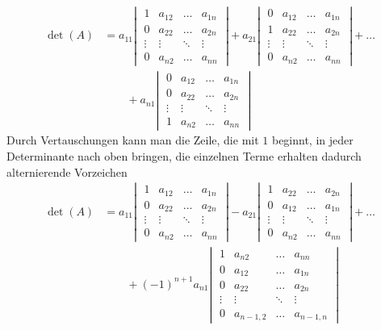 \begin{align*}
\det(A)
&=
a_{11}
\left|\;
\begin{matrix}
1&a_{12}&\dots&a_{1n}\\
0&a_{22}&\dots&a_{2n}\\
\vdots&\vdots&\ddots&\vdots\\
0&a_{n2}&\dots&a_{nn}
\end{matrix}
\;\right|
+a_{21}
\left|\;
\begin{matrix}
0&a_{12}&\dots&a_{1n}\\
1&a_{22}&\dots&a_{2n}\\
\vdots&\vdots&\ddots&\vdots\\
0&a_{n2}&\dots&a_{nn}
\end{matrix}
\;\right|
+\dots
\\
&\qquad
+a_{n1}
\left|\;
\begin{matrix}
0&a_{12}&\dots&a_{1n}\\
0&a_{22}&\dots&a_{2n}\\
\vdots&\vdots&\ddots&\vdots\\
1&a_{n2}&\dots&a_{nn}
\end{matrix}
\;\right|
\end{align*}
Durch Vertauschungen kann man die Zeile, die mit $1$ beginnt, in jeder
Determinante nach oben bringen, die einzelnen Terme erhalten dadurch
alternierende Vorzeichen
\begin{align*}
\det(A)
&=
a_{11}
\left|\;
\begin{matrix}
1&a_{12}&\dots&a_{1n}\\
0&a_{22}&\dots&a_{2n}\\
\vdots&\vdots&\ddots&\vdots\\
0&a_{n2}&\dots&a_{nn}
\end{matrix}
\;\right|
-a_{21}
\left|\;
\begin{matrix}
1&a_{22}&\dots&a_{2n}\\
0&a_{12}&\dots&a_{1n}\\
\vdots&\vdots&\ddots&\vdots\\
0&a_{n2}&\dots&a_{nn}
\end{matrix}
\;\right|
+\dots
\\
&\qquad
+(-1)^{n+1}a_{n1}
\left|\;
\begin{matrix}
1&a_{n2}&\dots&a_{nn}\\
0&a_{12}&\dots&a_{1n}\\
0&a_{22}&\dots&a_{2n}\\
\vdots&\vdots&\ddots&\vdots\\
0&a_{n-1,2}&\dots&a_{n-1,n}
\end{matrix}
\;\right|
\end{align*}
